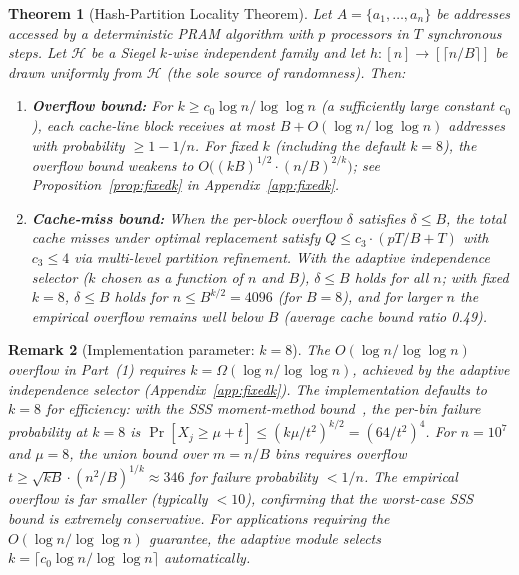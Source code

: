 \documentclass[11pt]{article}
\newtheorem{theorem}{Theorem}
\newtheorem{remark}[theorem]{Remark}
\begin{document}
\begin{theorem}[Hash-Partition Locality Theorem]
\label{thm:hplt}
Let $A = \{a_1, \ldots, a_n\}$ be addresses accessed by a deterministic
PRAM algorithm with $p$ processors in $T$ synchronous steps.  Let
$\mathcal{H}$ be a Siegel $k$-wise independent family and let
$h: [n] \to [\lceil n/B \rceil]$ be drawn uniformly from $\mathcal{H}$
(the sole source of randomness).  Then:
\begin{enumerate}
\item \textbf{Overflow bound:} For $k \ge c_0 \log n / \log\log n$
  (a sufficiently large constant $c_0$), each cache-line block receives
  at most $B + O(\log n / \log\log n)$ addresses with probability
  $\ge 1 - 1/n$.  For fixed $k$ (including the default $k = 8$), the
  overflow bound weakens to $O\bigl((kB)^{1/2} \cdot (n/B)^{2/k}\bigr)$;
  see Proposition~\ref{prop:fixedk} in Appendix~\ref{app:fixedk}.
\item \textbf{Cache-miss bound:} When the per-block overflow $\delta$
  satisfies $\delta \le B$, the total cache misses under optimal
  replacement satisfy $Q \le c_3 \cdot (pT/B + T)$ with $c_3 \le 4$
  via multi-level partition refinement.  With the adaptive independence
  selector ($k$ chosen as a function of $n$ and $B$), $\delta \le B$
  holds for all $n$; with fixed $k = 8$, $\delta \le B$ holds for
  $n \le B^{k/2} = 4096$ (for $B = 8$), and for larger $n$ the
  empirical overflow remains well below $B$
  (average cache bound ratio 0.49).
\end{enumerate}
\end{theorem}

\begin{remark}[Implementation parameter: $k = 8$]
\label{rem:k8}
The $O(\log n / \log\log n)$ overflow in Part~(1) requires
$k = \Omega(\log n / \log\log n)$, achieved by the adaptive independence
selector (Appendix~\ref{app:fixedk}).  The implementation defaults to
$k = 8$ for efficiency: with the SSS moment-method
bound~\cite{schmidt1995chernoff},
the per-bin failure probability at $k = 8$ is
$\Pr[X_j \ge \mu + t] \le (k\mu/t^2)^{k/2} = (64/t^2)^4$.
For $n = 10^7$ and $\mu = 8$, the union bound over $m = n/B$ bins
requires overflow $t \ge \sqrt{kB} \cdot (n^2/B)^{1/k} \approx 346$
for failure probability $< 1/n$.  The empirical overflow is far smaller
(typically $< 10$), confirming that the worst-case SSS bound is
extremely conservative.  For applications requiring the
$O(\log n / \log\log n)$ guarantee, the adaptive module selects
$k = \lceil c_0 \log n / \log\log n \rceil$ automatically.
\end{remark}
\end{document}
